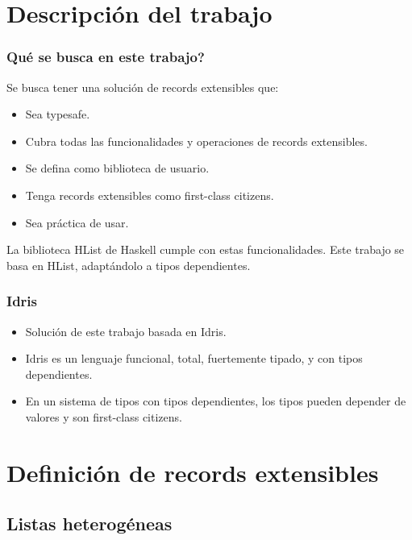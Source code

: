 \documentclass{beamer}
\begin{document}
\section{Descripción del trabajo}

\begin{frame}
\frametitle{Qué se busca en este trabajo?}

Se busca tener una solución de records extensibles que:

\begin{itemize}
\item Sea typesafe.
\item Cubra todas las funcionalidades y operaciones de records extensibles.
\item Se defina como biblioteca de usuario.
\item Tenga records extensibles como first-class citizens.
\item Sea práctica de usar.
\end{itemize}

\pause

La biblioteca HList de Haskell cumple con estas funcionalidades. Este trabajo se basa en HList, adaptándolo a tipos dependientes.

\end{frame}

\begin{frame}
\frametitle{Idris}

\begin{itemize}
\item Solución de este trabajo basada en Idris.
\item Idris es un lenguaje funcional, total, fuertemente tipado, y con tipos dependientes.
\item En un sistema de tipos con tipos dependientes, los tipos pueden depender de valores y son first-class citizens.
\end{itemize}
\end{frame}

\section{Definición de records extensibles}

\subsection{Listas heterogéneas}
\end{document}
